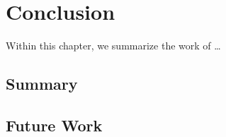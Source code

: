 \setchaptertoc
\chapter{Conclusion}\label{chp:conclusion}
\begin{summary}
   Within this chapter, we summarize the work of \ldots
\end{summary}

\section{Summary}

\section{Future Work}